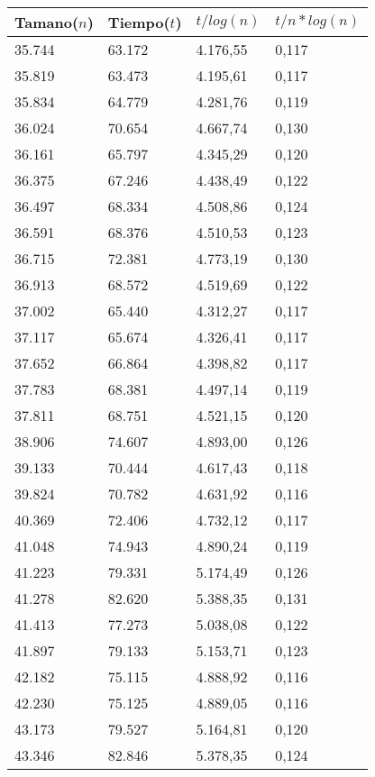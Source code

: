 \begin{table}[H]
\parbox{0.3\textwidth}{
  \begin{tabular}{| l | l | l |l |}
    \hline
    Tamano($n$) & Tiempo($t$) & $t / log(n)$ & $t / n*log(n)$ \\ \hline
35.744	&	63.172	&	4.176,55	&	0,117	\\ \hline
35.819	&	63.473	&	4.195,61	&	0,117	\\ \hline
35.834	&	64.779	&	4.281,76	&	0,119	\\ \hline
36.024	&	70.654	&	4.667,74	&	0,130	\\ \hline
36.161	&	65.797	&	4.345,29	&	0,120	\\ \hline
36.375	&	67.246	&	4.438,49	&	0,122	\\ \hline
36.497	&	68.334	&	4.508,86	&	0,124	\\ \hline
36.591	&	68.376	&	4.510,53	&	0,123	\\ \hline
36.715	&	72.381	&	4.773,19	&	0,130	\\ \hline
36.913	&	68.572	&	4.519,69	&	0,122	\\ \hline
37.002	&	65.440	&	4.312,27	&	0,117	\\ \hline
37.117	&	65.674	&	4.326,41	&	0,117	\\ \hline
37.652	&	66.864	&	4.398,82	&	0,117	\\ \hline
37.783	&	68.381	&	4.497,14	&	0,119	\\ \hline
37.811	&	68.751	&	4.521,15	&	0,120	\\ \hline
38.906	&	74.607	&	4.893,00	&	0,126	\\ \hline
39.133	&	70.444	&	4.617,43	&	0,118	\\ \hline
39.824	&	70.782	&	4.631,92	&	0,116	\\ \hline
40.369	&	72.406	&	4.732,12	&	0,117	\\ \hline
41.048	&	74.943	&	4.890,24	&	0,119	\\ \hline
41.223	&	79.331	&	5.174,49	&	0,126	\\ \hline
41.278	&	82.620	&	5.388,35	&	0,131	\\ \hline
41.413	&	77.273	&	5.038,08	&	0,122	\\ \hline
41.897	&	79.133	&	5.153,71	&	0,123	\\ \hline
42.182	&	75.115	&	4.888,92	&	0,116	\\ \hline
42.230	&	75.125	&	4.889,05	&	0,116	\\ \hline
43.173	&	79.527	&	5.164,81	&	0,120	\\ \hline
43.346	&	82.846	&	5.378,35	&	0,124	\\ \hline

\end{tabular}}
\end{table}
